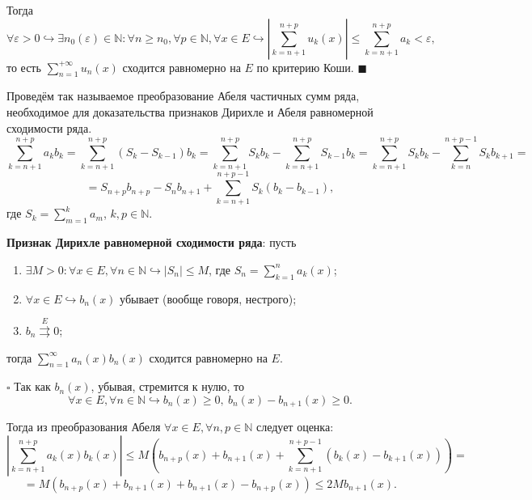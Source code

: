 \documentclass[12pt, a4paper, reqno]{article}
\begin{document}
    Тогда
    \begin{equation*}
        \forall \varepsilon > 0 \hookrightarrow \exists n_0(\varepsilon) \in \mathbb{N}:
        \forall n \geq n_0, \forall p \in \mathbb{N}, \forall x \in E \hookrightarrow
        \left|\sum\limits_{k = n + 1}^{n + p} u_k(x)\right| \leq
        \sum\limits_{k = n + 1}^{n + p} a_k < \varepsilon,
    \end{equation*}
    то есть $\sum\limits_{n = 1}^{+\infty} u_n(x)$ сходится равномерно на $E$ по критерию Коши.
    $\blacksquare$

    Проведём так называемое преобразование Абеля частичных сумм ряда, необходимое для доказательства
    признаков Дирихле и Абеля равномерной сходимости ряда.
    \begin{equation*}
        \sum\limits_{k = n + 1}^{n + p} a_k b_k =
        \sum\limits_{k = n + 1}^{n + p} (S_k - S_{k - 1}) b_k =
        \sum\limits_{k = n + 1}^{n + p} S_k b_k - \sum\limits_{k = n + 1}^{n + p} S_{k - 1} b_k =
        \sum\limits_{k = n + 1}^{n + p} S_k b_k - \sum\limits_{k = n}^{n + p - 1} S_k b_{k + 1} =
    \end{equation*}
    \begin{equation*}
        = S_{n + p}b_{n + p} - S_n b_{n + 1} + \sum\limits_{k = n + 1}^{n + p - 1} S_k(b_k - b_{k - 1}),
    \end{equation*}
    где $S_k = \sum\limits_{m = 1}^{k} a_m$, $k, p \in \mathbb{N}$.

    \textbf{Признак Дирихле равномерной сходимости ряда}: пусть
    \begin{enumerate}
        \item $\exists M > 0: \forall x \in E, \forall n \in \mathbb{N} \hookrightarrow
               |S_n| \leq M$, где $S_n = \sum\limits_{k = 1}^{n} a_k(x)$;
        \item $\forall x \in E \hookrightarrow b_n(x)$ убывает (вообще говоря, нестрого);
        \item $b_n \overset{E}{\rightrightarrows} 0$;
    \end{enumerate}
    тогда $\sum\limits_{n = 1}^{\infty} a_n(x)b_n(x)$ сходится равномерно на $E$.

    $\square$
    Так как $b_n(x)$, убывая, стремится к нулю, то
    \begin{equation*}
        \forall x \in E, \forall n \in \mathbb{N} \hookrightarrow
        b_n(x) \geq 0,\ b_n(x) - b_{n + 1}(x) \geq 0.
    \end{equation*}

    Тогда из преобразования Абеля $\forall x \in E, \forall n, p \in \mathbb{N}$ следует оценка:
    \begin{equation*}
        \left|\sum\limits_{k = n + 1}^{n + p} a_k(x)b_k(x)\right| \leq
        M\left(b_{n + p}(x) + b_{n + 1}(x) +
            \sum\limits_{k = n + 1}^{n + p - 1} (b_k(x) - b_{k + 1}(x))\right) =
    \end{equation*}
    \begin{equation*}
        = M(b_{n + p}(x) + b_{n + 1}(x) + b_{n + 1}(x) - b_{n + p}(x)) \leq 2 M b_{n + 1}(x).
    \end{equation*}
\end{document}
